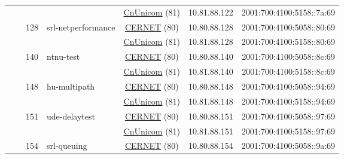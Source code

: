 \begin{small}
\begin{center}
\begin{longtable}{|c|c|c|c|c|c|c|c|}
  &  &  &  & \multicolumn{2}{|c|}{\tiny{\href{http://www.chinaunicom.com}{CnUnicom} (81)}} & \tiny{10.81.88.122} & \tiny{2001:700:4100:5158::7a:69} \\* \cline{3-3}\cline{4-4}\cline{5-5}\cline{6-6}\cline{7-7}\cline{8-8}
  &  & \multirow{2}{*}{\tiny{128}} & \multicolumn{1}{|l|}{\multirow{2}{*}{\tiny{srl-netperformance}}} & \multicolumn{2}{|c|}{\tiny{\href{http://www.cernet.edu.cn}{CERNET} (80)}} & \tiny{10.80.88.128} & \tiny{2001:700:4100:5058::80:69} \\* \cline{5-5}\cline{6-6}\cline{7-7}\cline{8-8}
  &  &  &  & \multicolumn{2}{|c|}{\tiny{\href{http://www.chinaunicom.com}{CnUnicom} (81)}} & \tiny{10.81.88.128} & \tiny{2001:700:4100:5158::80:69} \\* \cline{3-3}\cline{4-4}\cline{5-5}\cline{6-6}\cline{7-7}\cline{8-8}
  &  & \multirow{2}{*}{\tiny{140}} & \multicolumn{1}{|l|}{\multirow{2}{*}{\tiny{ntnu-test}}} & \multicolumn{2}{|c|}{\tiny{\href{http://www.cernet.edu.cn}{CERNET} (80)}} & \tiny{10.80.88.140} & \tiny{2001:700:4100:5058::8c:69} \\* \cline{5-5}\cline{6-6}\cline{7-7}\cline{8-8}
  &  &  &  & \multicolumn{2}{|c|}{\tiny{\href{http://www.chinaunicom.com}{CnUnicom} (81)}} & \tiny{10.81.88.140} & \tiny{2001:700:4100:5158::8c:69} \\* \cline{3-3}\cline{4-4}\cline{5-5}\cline{6-6}\cline{7-7}\cline{8-8}
  &  & \multirow{2}{*}{\tiny{148}} & \multicolumn{1}{|l|}{\multirow{2}{*}{\tiny{hu-multipath}}} & \multicolumn{2}{|c|}{\tiny{\href{http://www.cernet.edu.cn}{CERNET} (80)}} & \tiny{10.80.88.148} & \tiny{2001:700:4100:5058::94:69} \\* \cline{5-5}\cline{6-6}\cline{7-7}\cline{8-8}
  &  &  &  & \multicolumn{2}{|c|}{\tiny{\href{http://www.chinaunicom.com}{CnUnicom} (81)}} & \tiny{10.81.88.148} & \tiny{2001:700:4100:5158::94:69} \\* \cline{3-3}\cline{4-4}\cline{5-5}\cline{6-6}\cline{7-7}\cline{8-8}
  &  & \multirow{2}{*}{\tiny{151}} & \multicolumn{1}{|l|}{\multirow{2}{*}{\tiny{ude-delaytest}}} & \multicolumn{2}{|c|}{\tiny{\href{http://www.cernet.edu.cn}{CERNET} (80)}} & \tiny{10.80.88.151} & \tiny{2001:700:4100:5058::97:69} \\* \cline{5-5}\cline{6-6}\cline{7-7}\cline{8-8}
  &  &  &  & \multicolumn{2}{|c|}{\tiny{\href{http://www.chinaunicom.com}{CnUnicom} (81)}} & \tiny{10.81.88.151} & \tiny{2001:700:4100:5158::97:69} \\* \cline{3-3}\cline{4-4}\cline{5-5}\cline{6-6}\cline{7-7}\cline{8-8}
  &  & \multirow{2}{*}{\tiny{154}} & \multicolumn{1}{|l|}{\multirow{2}{*}{\tiny{srl-queuing}}} & \multicolumn{2}{|c|}{\tiny{\href{http://www.cernet.edu.cn}{CERNET} (80)}} & \tiny{10.80.88.154} & \tiny{2001:700:4100:5058::9a:69} \\* \cline{5-5}\cline{6-6}\cline{7-7}\cline{8-8}

\end{longtable}
\end{center}
\end{small}
